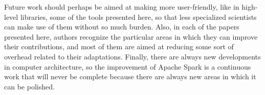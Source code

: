 \documentclass{article}
\begin{document}
Future work should perhaps be aimed at making more user-friendly, like in high-level libraries, some of the tools presented here, so that less specialized scientists can make use of them without so much burden. Also, in each of the papers presented here, authors recognize the particular areas in which they can improve their contributions, and most of them are aimed at reducing some sort of overhead related to their adaptations. Finally, there are always new developments in computer architecture, so the improvement of Apache Spark is a continuous work that will never be complete because there are always new areas in which it can be polished.


\printbibliography
\end{document}
